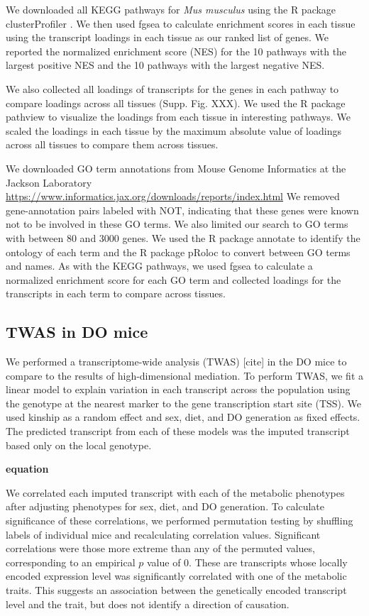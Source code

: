 \documentclass[
]{article}
\begin{document}
We downloaded all KEGG \cite{pmid36300620} pathways for
\textit{Mus musculus} using the R package clusterProfiler
\cite{pmid36300620}. We then used fgsea to calculate enrichment scores
in each tissue using the transcript loadings in each tissue as our
ranked list of genes. We reported the normalized enrichment score (NES)
for the 10 pathways with the largest positive NES and the 10 pathways
with the largest negative NES.

We also collected all loadings of transcripts for the genes in each
pathway to compare loadings across all tissues (Supp. Fig. XXX). We used
the R package pathview \cite{pmid23740750} to visualize the loadings
from each tissue in interesting pathways. We scaled the loadings in each
tissue by the maximum absolute value of loadings across all tissues to
compare them across tissues.

We downloaded GO term annotations from Mouse Genome Informatics at the
Jackson Laboratory \cite{pmid33231642}
\url{https://www.informatics.jax.org/downloads/reports/index.html} We
removed gene-annotation pairs labeled with NOT, indicating that these
genes were known not to be involved in these GO terms. We also limited
our search to GO terms with between 80 and 3000 genes. We used the R
package annotate \cite{R_annotate} to identify the ontology of each term
and the R package pRoloc \cite{pmid24413670} to convert between GO terms
and names. As with the KEGG pathways, we used fgsea to calculate a
normalized enrichment score for each GO term and collected loadings for
the transcripts in each term to compare across tissues.

\subsection{TWAS in DO mice}\label{twas-in-do-mice}

We performed a transcriptome-wide analysis (TWAS) {[}cite{]} in the DO
mice to compare to the results of high-dimensional mediation. To perform
TWAS, we fit a linear model to explain variation in each transcript
across the population using the genotype at the nearest marker to the
gene transcription start site (TSS). We used kinship as a random effect
and sex, diet, and DO generation as fixed effects. The predicted
transcript from each of these models was the imputed transcript based
only on the local genotype.

\textbf{equation}

We correlated each imputed transcript with each of the metabolic
phenotypes after adjusting phenotypes for sex, diet, and DO generation.
To calculate significance of these correlations, we performed
permutation testing by shuffling labels of individual mice and
recalculating correlation values. Significant correlations were those
more extreme than any of the permuted values, corresponding to an
empirical \(p\) value of 0. These are transcripts whose locally encoded
expression level was significantly correlated with one of the metabolic
traits. This suggests an association between the genetically encoded
transcript level and the trait, but does not identify a direction of
causation.
\end{document}
